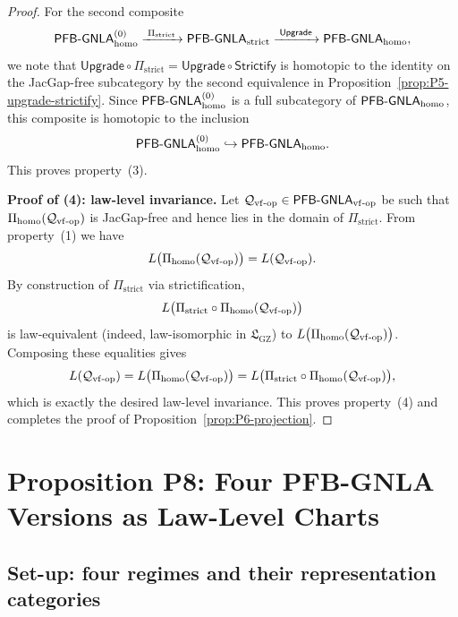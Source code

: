 \documentclass[11pt]{book}
\theoremstyle{plain}
\theoremstyle{definition}
\newcommand{\GZLS}{\ensuremath{\mathfrak{L}_{\mathrm{GZ}}}}       \newcommand{\GZLT}{\ensuremath{M_{!w}}}                           \newcommand{\GZLOC}{\ensuremath{A_M}}                             \newcommand{\GZLCurv}{\ensuremath{\mathcal{F}_{\mathrm{law}}}}
\begin{document}
\begin{proof}
For the second composite
\[
  \mathsf{PFB\text- GNLA}_{\mathrm{homo}}^{(0)}
  \xrightarrow{\;\Pi_{\mathrm{strict}}\;}
  \mathsf{PFB\text- GNLA}_{\mathrm{strict}}
  \xrightarrow{\;\mathsf{Upgrade}\;}
  \mathsf{PFB\text- GNLA}_{\mathrm{homo}},
\]
we note that
\(\mathsf{Upgrade}\circ\Pi_{\mathrm{strict}}
 =\mathsf{Upgrade}\circ\mathsf{Strictify}\) is homotopic to the
identity on the JacGap-free subcategory by the second equivalence in
Proposition~\ref{prop:P5-upgrade-strictify}.  Since
\(\mathsf{PFB\text- GNLA}_{\mathrm{homo}}^{(0)}\) is a full subcategory
of \(\mathsf{PFB\text- GNLA}_{\mathrm{homo}}\), this composite is
homotopic to the inclusion
\[
  \mathsf{PFB\text- GNLA}_{\mathrm{homo}}^{(0)}
  \hookrightarrow
  \mathsf{PFB\text- GNLA}_{\mathrm{homo}}.
\]
This proves property~\textnormal{(3)}.



\medskip\noindent
\textbf{Proof of (4): law-level invariance.}
Let \(\mathcal{Q}_{\mathrm{vf\text- op}}\in
\mathsf{PFB\text- GNLA}_{\mathrm{vf\text- op}}\) be such that
\(\Pi_{\mathrm{homo}}(\mathcal{Q}_{\mathrm{vf\text- op}})\) is
JacGap-free and hence lies in the domain of \(\Pi_{\mathrm{strict}}\).
From property~\textnormal{(1)} we have
\[
  L\bigl(\Pi_{\mathrm{homo}}(\mathcal{Q}_{\mathrm{vf\text- op}})\bigr)
  =
  L(\mathcal{Q}_{\mathrm{vf\text- op}}).
\]
By construction of \(\Pi_{\mathrm{strict}}\) via strictification,
\[
  L\bigl(\Pi_{\mathrm{strict}}\circ
          \Pi_{\mathrm{homo}}(\mathcal{Q}_{\mathrm{vf\text- op}})
    \bigr)
\]
is law-equivalent (indeed, law-isomorphic in \(\GZLS\)) to
\(L\bigl(\Pi_{\mathrm{homo}}(\mathcal{Q}_{\mathrm{vf\text- op}})\bigr)\).
Composing these equalities gives
\[
  L(\mathcal{Q}_{\mathrm{vf\text- op}})
  =
  L\bigl(\Pi_{\mathrm{homo}}(\mathcal{Q}_{\mathrm{vf\text- op}})\bigr)
  =
  L\bigl(\Pi_{\mathrm{strict}}\circ
          \Pi_{\mathrm{homo}}(\mathcal{Q}_{\mathrm{vf\text- op}})
    \bigr),
\]
which is exactly the desired law-level invariance.  This proves
property~\textnormal{(4)} and completes the proof of
Proposition~\ref{prop:P6-projection}.



\end{proof}

\section{Proposition P8: Four PFB-GNLA Versions as Law-Level Charts}
\label{app:II-P8}

\subsection*{Set-up: four regimes and their representation categories}
\end{document}
